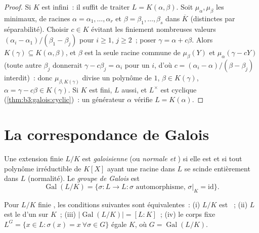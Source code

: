 \begin{proof}
Si $K$ est infini~: il suffit de traiter $L = K(\alpha, \beta)$.
Soit $\mu_\alpha, \mu_\beta$ les minimaux, de racines $\alpha =
\alpha_1, \dots, \alpha_r$ et $\beta = \beta_1, \dots,
\beta_s$ dans $\overline K$ (distinctes par séparabilité).
Choisir $c \in K$ évitant les finiement nombreuses valeurs
$(\alpha_i - \alpha_1)/(\beta_1 - \beta_j)$ pour $i \geq 1$, $j
\geq 2$~; poser $\gamma = \alpha + c\beta$. Alors $K(\gamma)
\subseteq K(\alpha, \beta)$, et $\beta$ est la seule racine
commune de $\mu_\beta(Y)$ et $\mu_\alpha(\gamma - cY)$ (toute
autre $\beta_j$ donnerait $\gamma - c\beta_j = \alpha_i$ pour un
$i$, d'où $c = (\alpha_i - \alpha)/(\beta - \beta_j)$ interdit)~:
donc $\mu_{\beta, K(\gamma)}$ divise un polynôme de  $1$,
$\beta \in K(\gamma)$, $\alpha = \gamma - c\beta \in
K(\gamma)$. Si $K$ est fini, $L$ aussi, et $L^\times$ est
cyclique (\cref{thm:b3:galois:cyclic})~: un générateur $\alpha$
vérifie $L = K(\alpha)$.
\end{proof}

\section{La correspondance de Galois}

\begin{definition}\label{def:b3:galois:galois}
Une extension finie $L/K$ est \emph{galoisienne} (ou \emph{normale et }) si elle est
 et si tout polynôme irréductible de $K[X]$ ayant une
racine dans $L$ se scinde entièrement dans $L$ (normalité). Le
\emph{groupe de Galois} est
\[
\operatorname{Gal}(L/K) = \{\sigma \colon L \to L : \sigma
\text{ automorphisme, } \sigma|_K = \mathrm{id}\}.
\]
\end{definition}

\begin{proposition}\label{prop:b3:galois:galoisorder}
Pour $L/K$ finie , les conditions suivantes sont
équivalentes~: (i) $L/K$ est ~; (ii) $L$ est le  d'un  sur $K$~; (iii) $|\operatorname{Gal}(L/K)| = [L:K]$~; (iv) le corps fixe
$L^G = \{x \in L : \sigma(x) = x\ \forall \sigma \in G\}$ égale
$K$, où $G = \operatorname{Gal}(L/K)$.
\end{proposition}

